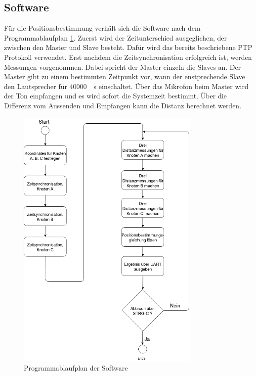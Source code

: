 \subsection{Software}
Für die Positionsbestimmung verhält sich die Software nach dem Programmablaufplan \ref{img:PAP}. Zuerst wird der Zeitunterschied ausgeglichen, der zwischen den Master und Slave besteht. Dafür wird das bereits beschriebene PTP Protokoll verwendet. Erst nachdem die Zeitsynchronisation erfolgreich ist, werden Messungen vorgenommen. Dabei spricht der Master einzeln die Slaves an. Der Master gibt zu einem bestimmten Zeitpunkt vor, wann der enstprechende Slave den Lautsprecher für \SI{40000}{\mu\s} einschaltet. Über das Mikrofon beim Master wird der Ton empfangen und es wird sofort die Systemzeit bestimmt. Über die Differenz vom Aussenden und Empfangen kann die Distanz berechnet werden.
\begin{figure}[H]
        \centering
        \includegraphics[width=0.8\textwidth]{images/PAP.png}
        \caption{Programmablaufplan der Software}
        \label{img:PAP}
\end{figure}

